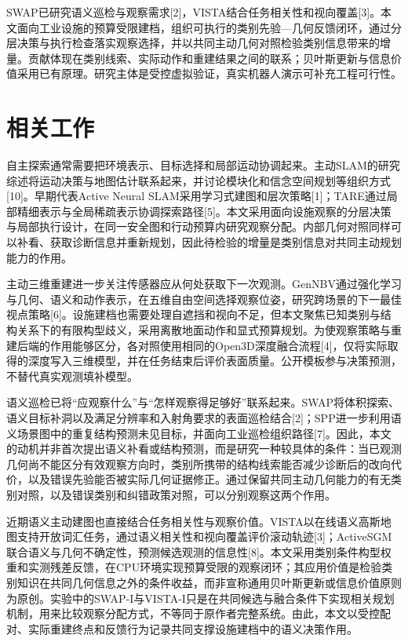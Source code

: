 \documentclass[11pt,a4paper]{article}
\begin{document}
SWAP已研究语义巡检与观察需求{[}2{]}，VISTA结合任务相关性和视向覆盖{[}3{]}。本文面向工业设施的预算受限建档，组织可执行的类别先验---几何反馈闭环，通过分层决策与执行检查落实观察选择，并以共同主动几何对照检验类别信息带来的增量。贡献体现在类别线索、实际动作和重建结果之间的联系；贝叶斯更新与信息价值采用已有原理。研究主体是受控虚拟验证，真实机器人演示可补充工程可行性。

\hypertarget{ux76f8ux5173ux5de5ux4f5c}{%
\section{相关工作}\label{ux76f8ux5173ux5de5ux4f5c}}

自主探索通常需要把环境表示、目标选择和局部运动协调起来。主动SLAM的研究综述将运动决策与地图估计联系起来，并讨论模块化和信念空间规划等组织方式{[}10{]}。早期代表Active Neural SLAM采用学习式建图和层次策略{[}1{]}；TARE通过局部精细表示与全局稀疏表示协调探索路径{[}5{]}。本文采用面向设施观察的分层决策与局部执行设计，在同一安全图和行动预算内研究观察分配。内部几何对照同样可以补看、获取诊断信息并重新规划，因此待检验的增量是类别信息对共同主动规划能力的作用。

主动三维重建进一步关注传感器应从何处获取下一次观测。GenNBV通过强化学习与几何、语义和动作表示，在五维自由空间选择观察位姿，研究跨场景的下一最佳视点策略{[}6{]}。设施建档也需要处理自遮挡和视向不足，但本文聚焦已知类别与结构关系下的有限构型歧义，采用离散地面动作和显式预算规划。为使观察策略与重建后端的作用能够区分，各对照使用相同的Open3D深度融合流程{[}4{]}，仅将实际取得的深度写入三维模型，并在任务结束后评价表面质量。公开模板参与决策预测，不替代真实观测填补模型。

语义巡检已将``应观察什么''与``怎样观察得足够好''联系起来。SWAP将体积探索、语义目标补洞以及满足分辨率和入射角要求的表面巡检结合{[}2{]}；SPP进一步利用语义场景图中的重复结构预测未见目标，并面向工业巡检组织路径{[}7{]}。因此，本文的动机并非首次提出语义补看或结构预测，而是研究一种较具体的条件：当已观测几何尚不能区分有效观察方向时，类别所携带的结构线索能否减少诊断后的改向代价，以及错误先验能否被实际几何证据修正。通过保留共同主动几何能力的有无类别对照，以及错误类别和纠错政策对照，可以分别观察这两个作用。

近期语义主动建图也直接结合任务相关性与观察价值。VISTA以在线语义高斯地图支持开放词汇任务，通过语义相关性和视向覆盖评价滚动轨迹{[}3{]}；ActiveSGM联合语义与几何不确定性，预测候选观测的信息性{[}8{]}。本文采用类别条件构型权重和实测残差反馈，在CPU环境实现预算受限的观察闭环；其应用价值是检验类别知识在共同几何信息之外的条件收益，而非宣称通用贝叶斯更新或信息价值原则为原创。实验中的SWAP-I与VISTA-I只是在共同候选与融合条件下实现相关规划机制，用来比较观察分配方式，不等同于原作者完整系统。由此，本文以受控配对、实际重建终点和反馈行为记录共同支撑设施建档中的语义决策作用。
\end{document}
